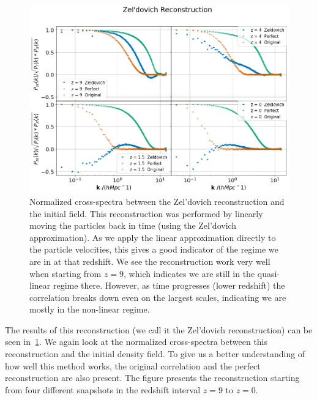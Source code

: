 \begin{figure}
    \centering
    \includegraphics[width=1\columnwidth]{images/realRecon/zeld.png}%
    
    \caption{
    Normalized cross-spectra between the Zel'dovich reconstruction and the initial field. This reconstruction was performed by linearly moving the particles back in time (using the Zel'dovich approximation). As we apply the linear approximation directly to the particle velocities, this gives a good indicator of the regime we are in at that redshift. We see the reconstruction work very well when starting from $z=9$, which indicates we are still in the quasi-linear regime there. However, as time progresses (lower redshift) the correlation breaks down even on the largest scales, indicating we are mostly in the non-linear regime. 
    }
    
    \label{fig:4.1}
\end{figure}

The results of this reconstruction (we call it the Zel'dovich reconstruction) can be seen in~\ref{fig:4.1}. We again look at the normalized cross-spectra between this reconstruction and the initial density field. To give us a better understanding of how well this method works, the original correlation and the perfect reconstruction are also present. The figure presents the reconstruction starting from four different snapshots in the redshift interval $z=9$ to $z=0$.

